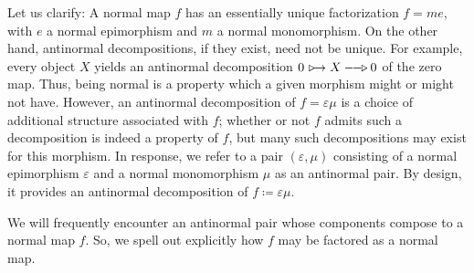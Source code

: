 \documentclass [12pt,oneside]{book}%
\theoremstyle{captionstyle}  %
\newcommand{\DefEq}{\coloneq} 		%
\newcommand{\NEpi}{-\hspace{-0.8ex}-\hspace{-0.7ex}\triangleright}	%
\newcommand{\NMono}{\ \triangleright\hspace{-0.9ex}\rightarrow}			%
\newcommand{\ZeroObject}{0}                           %
\begin{document}
Let us clarify: A normal map $f$ has an essentially unique factorization $f=me$, with $e$ a normal epimorphism and $m$ a normal monomorphism. On the other hand, antinormal decompositions, if they exist, need not be unique. For example, every object $X$ yields an antinormal decomposition $\ZeroObject \NMono X \NEpi \ZeroObject$ of the zero map. Thus, being normal is a property which a given morphism might or might not have. However, an antinormal decomposition of $f=\varepsilon\mu$ is a choice of additional structure associated with $f$; whether or not $f$ admits such a decomposition is indeed a property of $f$, but many such decompositions may exist for this morphism. In response, we refer to a pair $(\varepsilon,\mu)$ consisting of a normal epimorphism $\varepsilon$ and a normal monomorphism $\mu$ as an antinormal pair. By design, it provides an antinormal decomposition of $f\DefEq \varepsilon\mu$. %
%

We will frequently encounter an antinormal pair whose components compose to a normal map $f$. So, we spell out explicitly how $f$ may be factored as a normal map.
\end{document}
